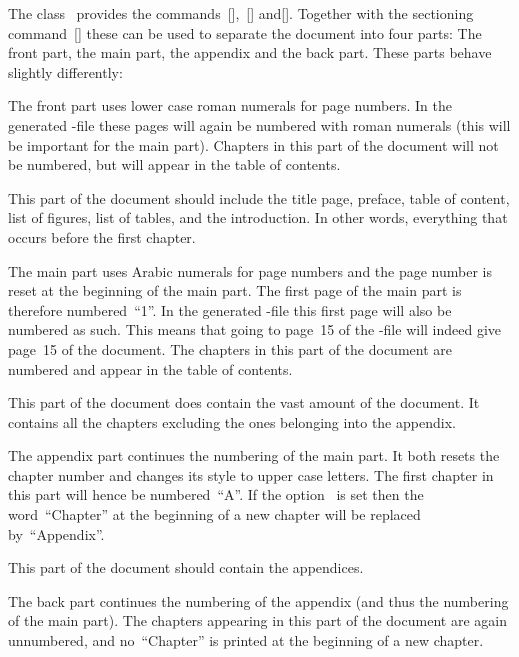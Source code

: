 The class~ provides the commands~[\comname],~[\comname] and[\comname].
Together with the sectioning command~[\comname] these can be used to separate the document into four parts:
The front part, the main part, the appendix and the back part.
These parts behave slightly differently:
\begin{myitemize}
  \item
    The front part uses lower case roman numerals for page numbers.
    In the generated -file these pages will again be numbered with roman numerals (this will be important for the main part).
    Chapters in this part of the document will not be numbered, but will appear in the table of contents.
    
    This part of the document should include the title page, preface, table of content, list of figures, list of tables, and the introduction.
    In other words, everything that occurs before the first chapter.
  \item
    The main part uses Arabic numerals for page numbers and the page number is reset at the beginning of the main part.
    The first page of the main part is therefore numbered~\enquote{1}.
    In the generated -file this first page will also be numbered as such.
    This means that going to page~15 of the -file will indeed give page~15 of the document.
    The chapters in this part of the document are numbered and appear in the table of contents.
    
    This part of the document does contain the vast amount of the document.
    It contains all the chapters excluding the ones belonging into the appendix.
  \item
    The appendix part continues the numbering of the main part.
    It both resets the chapter number and changes its style to upper case letters.
    The first chapter in this part will hence be numbered~\enquote{A}.
    If the option~ is set then the word~\enquote{Chapter} at the beginning of a new chapter will be replaced by~\enquote{Appendix}.
    
    This part of the document should contain the appendices.
  \item
    The back part continues the numbering of the appendix (and thus the numbering of the main part).
    The chapters appearing in this part of the document are again unnumbered, and no~\enquote{Chapter} is printed at the beginning of a new chapter.
    

\end{myitemize}
